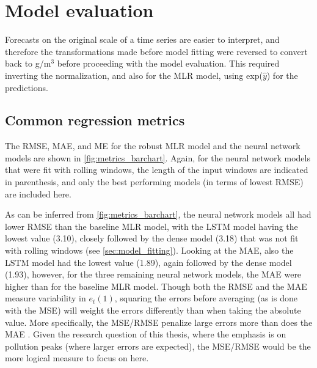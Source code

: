 
\section{Model evaluation}
Forecasts on the original scale of a time series are easier to interpret, and therefore the transformations made before model fitting were reversed to convert back to \textmugreek g/m$^3$ before proceeding with the model evaluation. This required inverting the normalization, and also for the MLR model, using exp($\hat{y}$) for the predictions. 

\subsection{Common regression metrics}
The RMSE, MAE, and ME for the robust MLR model and the neural network models are shown in \cref{fig:metrics_barchart}. Again, for the neural network models that were fit with rolling windows, the length of the input windows are indicated in parenthesis, and only the best performing models (in terms of lowest RMSE) are included here. 

As can be inferred from \cref{fig:metrics_barchart}, the neural network models all had lower RMSE than the baseline MLR model, with the LSTM model having the lowest value (3.10), closely followed by the dense model (3.18) that was not fit with rolling windows (see \cref{sec:model_fitting}). Looking at the MAE, also the LSTM model had the lowest value (1.89), again followed by the dense model (1.93), however, for the three remaining neural network models, the MAE were higher than for the baseline MLR model. Though both the RMSE and the MAE measure variability in $e_t(1)$, squaring the errors before averaging (as is done with the MSE) will weight the errors differently than when taking the absolute value. More specifically, the MSE/RMSE penalize large errors more than does the MAE \cite{reg_metrics2018}.
Given the research question of this thesis, where the emphasis is on pollution peaks (where larger errors are expected), the MSE/RMSE would be the more logical measure to focus on here. 

